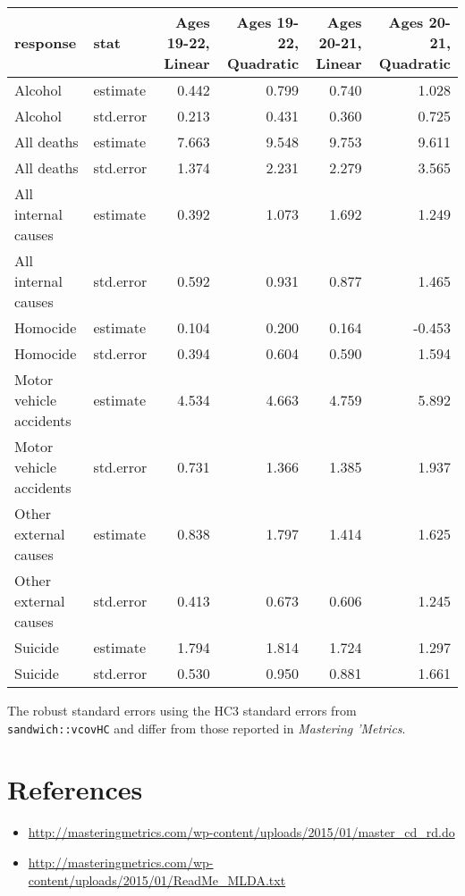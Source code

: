 \documentclass[]{book}
\providecommand{\tightlist}{%
  \setlength{\itemsep}{0pt}\setlength{\parskip}{0pt}}
\theoremstyle{definition}
\theoremstyle{definition}
\theoremstyle{definition}
\theoremstyle{remark}
\begin{document}
\begin{tabular}{l|l|r|r|r|r}
\hline
response & stat & Ages 19-22, Linear & Ages 19-22, Quadratic & Ages 20-21, Linear & Ages 20-21, Quadratic\\
\hline
Alcohol & estimate & 0.442 & 0.799 & 0.740 & 1.028\\
\hline
Alcohol & std.error & 0.213 & 0.431 & 0.360 & 0.725\\
\hline
All deaths & estimate & 7.663 & 9.548 & 9.753 & 9.611\\
\hline
All deaths & std.error & 1.374 & 2.231 & 2.279 & 3.565\\
\hline
All internal causes & estimate & 0.392 & 1.073 & 1.692 & 1.249\\
\hline
All internal causes & std.error & 0.592 & 0.931 & 0.877 & 1.465\\
\hline
Homocide & estimate & 0.104 & 0.200 & 0.164 & -0.453\\
\hline
Homocide & std.error & 0.394 & 0.604 & 0.590 & 1.594\\
\hline
Motor vehicle accidents & estimate & 4.534 & 4.663 & 4.759 & 5.892\\
\hline
Motor vehicle accidents & std.error & 0.731 & 1.366 & 1.385 & 1.937\\
\hline
Other external causes & estimate & 0.838 & 1.797 & 1.414 & 1.625\\
\hline
Other external causes & std.error & 0.413 & 0.673 & 0.606 & 1.245\\
\hline
Suicide & estimate & 1.794 & 1.814 & 1.724 & 1.297\\
\hline
Suicide & std.error & 0.530 & 0.950 & 0.881 & 1.661\\
\hline
\end{tabular}

The robust standard errors using the HC3 standard errors from
\texttt{sandwich::vcovHC} and differ from those reported in
\emph{Mastering 'Metrics}.

\hypertarget{references-3}{%
\section{References}\label{references-3}}

\begin{itemize}
\tightlist
\item
  \url{http://masteringmetrics.com/wp-content/uploads/2015/01/master_cd_rd.do}
\item
  \url{http://masteringmetrics.com/wp-content/uploads/2015/01/ReadMe_MLDA.txt}
\end{itemize}
\end{document}
